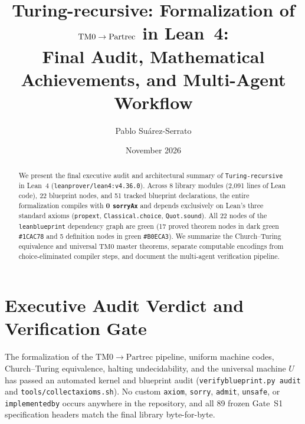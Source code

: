 \documentclass[10pt]{article}
\title{\vspace{-1.8em}\textbf{Turing-recursive: Formalization of $\TM \to \Partrec$ in Lean~4:\\Final Audit, Mathematical Achievements, and Multi-Agent Workflow}}
\author{Pablo Su\'arez-Serrato}
\date{November 2026\vspace{-1.0em}}
\renewcommand{\_}{\origus\allowbreak}
\newcommand{\Partrec}{\mathrm{Partrec}}
\newcommand{\TM}{\mathrm{TM0}}
\newcommand{\code}[1]{\texttt{#1}}
\newcommand{\LeanToolchain}{leanprover/lean4:v4.36.0}
\newcommand{\NModules}{8}
\newcommand{\NLines}{2{,}091}
\newcommand{\NTotalNodes}{22}
\newcommand{\NProvedNodes}{17}
\newcommand{\NDefNodes}{5}
\newcommand{\NLeanDecls}{51}
\newcommand{\NSorryAx}{0}
\begin{document}
\maketitle

\begin{abstract}
\noindent
We present the final executive audit and architectural summary of \code{Turing-recursive} in Lean~4
(\code{\LeanToolchain}). Across \NModules{} library modules (\NLines{} lines of Lean code),
\NTotalNodes{} blueprint nodes, and \NLeanDecls{} tracked blueprint declarations, the entire
formalization compiles with \textbf{\NSorryAx{} \code{sorryAx}} and depends exclusively on Lean's
three standard axioms (\code{propext}, \code{Classical.choice}, \code{Quot.sound}). All \NTotalNodes{}
nodes of the \code{leanblueprint} dependency graph are green (\NProvedNodes{} proved theorem nodes
in dark green \code{\#1CAC78} and \NDefNodes{} definition nodes in green \code{\#B0ECA3}). We summarize
the Church--Turing equivalence and universal $\TM$ master theorems, separate computable encodings from
choice-eliminated compiler steps, and document the multi-agent verification pipeline.
\end{abstract}

\section{Executive Audit Verdict and Verification Gate}

The formalization of the $\TM \to \Partrec$ pipeline, uniform machine codes, Church--Turing
equivalence, halting undecidability, and the universal machine $U$ has passed an automated kernel and
blueprint audit (\code{verify\_blueprint.py audit} and \code{tools/collect\_axioms.sh}). No custom
\code{axiom}, \code{sorry}, \code{admit}, \code{unsafe}, or \code{implemented\_by} occurs anywhere in
the repository, and all 89 frozen Gate~S1 specification headers match the final library byte-for-byte.
\end{document}
